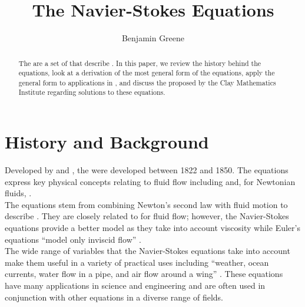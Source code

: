 \documentclass[12pt]{article}
\title{The Navier-Stokes Equations}
\author{Benjamin Greene}
\begin{document}
    \maketitle
    \begin{abstract}
        The  are a set of  that describe . In this paper, we review the history behind the equations, look at a derivation of the most general form of the equations, apply the general form to applications in , and discuss the  proposed by the Clay Mathematics Institute regarding solutions to these equations.
    \end{abstract}
    \tableofcontents
    \section{History and Background}
    Developed by  and , the  were developed between 1822 and 1850. The equations express key physical concepts relating to fluid flow including  and, for Newtonian fluids, . \\
    The equations stem from combining Newton's second law with fluid motion to describe . They are closely related to  for fluid flow; however, the Navier-Stokes equations provide a better model as they take into account viscosity while Euler's equations ``model only inviscid flow'' \cite{wiki}. \\
    The wide range of variables that the Navier-Stokes equations take into account make them useful in a variety of practical uses including ``weather, ocean currents, water flow in a pipe, and air flow around a wing'' \cite{wiki}. These equations have many applications in science and engineering and are often used in conjunction with other equations in a diverse range of fields.
\end{document}
